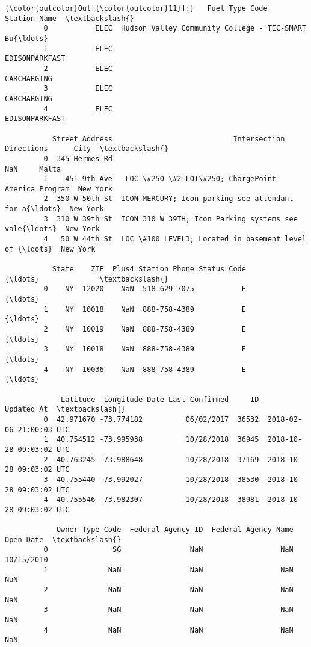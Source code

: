 \documentclass[11pt]{article}
\begin{document}
\begin{Verbatim}[commandchars=\\\{\}]
{\color{outcolor}Out[{\color{outcolor}11}]:}   Fuel Type Code                                       Station Name  \textbackslash{}
         0           ELEC  Hudson Valley Community College - TEC-SMART Bu{\ldots}   
         1           ELEC                                     EDISONPARKFAST   
         2           ELEC                                        CARCHARGING   
         3           ELEC                                        CARCHARGING   
         4           ELEC                                     EDISONPARKFAST   
         
           Street Address                            Intersection Directions      City  \textbackslash{}
         0  345 Hermes Rd                                                NaN     Malta   
         1    451 9th Ave   LOC \#250 \#2 LOT\#250; ChargePoint America Program  New York   
         2  350 W 50th St  ICON MERCURY; Icon parking see attendant for a{\ldots}  New York   
         3  310 W 39th St  ICON 310 W 39TH; Icon Parking systems see vale{\ldots}  New York   
         4   50 W 44th St  LOC \#100 LEVEL3; Located in basement level of {\ldots}  New York   
         
           State    ZIP  Plus4 Station Phone Status Code            {\ldots}              \textbackslash{}
         0    NY  12020    NaN  518-629-7075           E            {\ldots}               
         1    NY  10018    NaN  888-758-4389           E            {\ldots}               
         2    NY  10019    NaN  888-758-4389           E            {\ldots}               
         3    NY  10018    NaN  888-758-4389           E            {\ldots}               
         4    NY  10036    NaN  888-758-4389           E            {\ldots}               
         
             Latitude  Longitude Date Last Confirmed     ID               Updated At  \textbackslash{}
         0  42.971670 -73.774182          06/02/2017  36532  2018-02-06 21:00:03 UTC   
         1  40.754512 -73.995938          10/28/2018  36945  2018-10-28 09:03:02 UTC   
         2  40.763245 -73.988648          10/28/2018  37169  2018-10-28 09:03:02 UTC   
         3  40.755440 -73.992027          10/28/2018  38530  2018-10-28 09:03:02 UTC   
         4  40.755546 -73.982307          10/28/2018  38981  2018-10-28 09:03:02 UTC   
         
            Owner Type Code  Federal Agency ID  Federal Agency Name   Open Date  \textbackslash{}
         0               SG                NaN                  NaN  10/15/2010   
         1              NaN                NaN                  NaN         NaN   
         2              NaN                NaN                  NaN         NaN   
         3              NaN                NaN                  NaN         NaN   
         4              NaN                NaN                  NaN         NaN   
         

\end{Verbatim}
\end{document}
